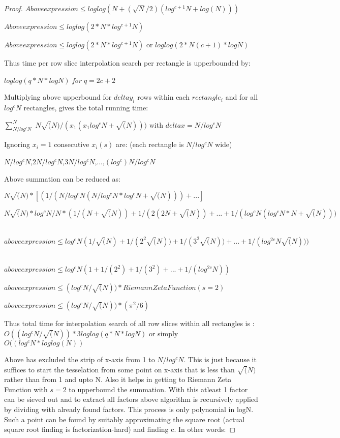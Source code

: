 \documentclass[11pt,onecolumn]{article}
\begin{document}
\begin{proof}
$Above expression \le loglog(N + (\sqrt{N}/2)(log^{c+1}N+log(N)))$

$Above expression \le loglog(2*N*log^{c+1}N)$

$Above expression \le loglog(2*N*log^{c+1}N)$ or $loglog(2*N(c+1)*logN)$

Thus time per row slice interpolation search per rectangle is upperbounded by:

\emph{$loglog(q*N*logN)$ for $q=2c+2$}

Multiplying above upperbound for $deltay_{i}$ rows within each $rectangle_{i}$ and for all $log^{c}N$ rectangles, gives the total running time:

$\sum_{N/log^{c}N}^{N}$ $N\sqrt(N)/(x_{1}(x_{1}log^{c}N+\sqrt(N)))$ with $deltax = N/log^{c}N$

Ignoring $x_{i}=1$ consecutive $x_{i}(s)$ are: (each rectangle is $N/log^{c}N$ wide)

$N/log^{c}N$,$2N/log^{c}N$,$3N/log^{c}N$,...,$(log^{c})N/log^{c}N$

Above summation can be reduced as:

$N\sqrt(N)*[(1/(N/log^{c}N(N/log^{c}N * log^{c}N + \sqrt(N))) + ...]$

$N\sqrt(N)*log^{c}N/N *(1/(N+\sqrt(N))+1/(2(2N+\sqrt(N))+...+1/(log^{c}N(log^{c}N*N+\sqrt(N)))$ \

$aboveexpression \le log^{c}N(1/\sqrt(N)+1/(2^{2}\sqrt(N))+1/(3^{2}\sqrt(N))+...+1/(log^{2c}N\sqrt(N)))$ \

$aboveexpression \le log^{c}N(1+1/(2^{2})+1/(3^{2})+...+1/(log^{2c}N))$ \

$aboveexpression \le (log^{c}N/\sqrt(N))*RiemannZetaFunction(s=2)$ \

$above expression \le (log^{c}N/\sqrt(N)) * (\pi^{2}/6)$

Thus total time for interpolation search of all row  slices within all rectangles is :
$O((log^{c}N/\sqrt(N))*3loglog(q*N*logN)$ or simply $O((log^{c}N*loglog(N))$

Above has excluded the strip of x-axis from 1 to $N/log^{c}N$. This is just because it suffices to start the tesselation from some point on x-axis that is less than $\sqrt(N)$ rather than from 1 and upto N. Also it helps in getting to Riemann Zeta Function with $s=2$ to upperbound the summation. With this atleast 1 factor can be sieved out and to extract all factors above algorithm is recursively applied by dividing with already found factors. This process is only polynomial in logN. Such a point can be found by suitably approximating the square root (actual square root finding is factorization-hard) and finding c. In other words:


\end{proof}
\end{document}
